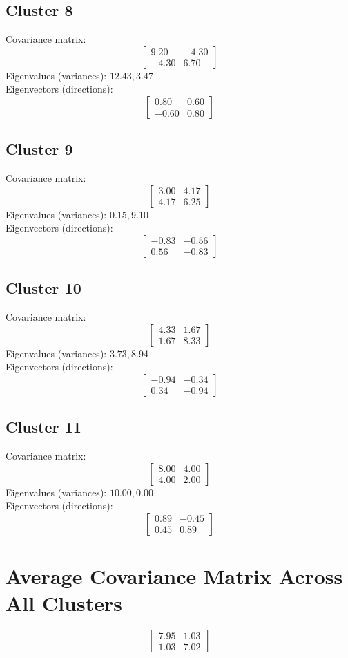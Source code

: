 \documentclass{article}
\begin{document}
\subsection*{Cluster 8}
Covariance matrix:
\[\begin{bmatrix}9.20 & -4.30 \\-4.30 & 6.70\end{bmatrix}\]
Eigenvalues (variances): $ 12.43, $3.47\\
Eigenvectors (directions):
\[\begin{bmatrix}0.80 & 0.60 \\-0.60 & 0.80\end{bmatrix}\]
\subsection*{Cluster 9}
Covariance matrix:
\[\begin{bmatrix}3.00 & 4.17 \\4.17 & 6.25\end{bmatrix}\]
Eigenvalues (variances): $ 0.15, $9.10\\
Eigenvectors (directions):
\[\begin{bmatrix}-0.83 & -0.56 \\0.56 & -0.83\end{bmatrix}\]
\subsection*{Cluster 10}
Covariance matrix:
\[\begin{bmatrix}4.33 & 1.67 \\1.67 & 8.33\end{bmatrix}\]
Eigenvalues (variances): $ 3.73, $8.94\\
Eigenvectors (directions):
\[\begin{bmatrix}-0.94 & -0.34 \\0.34 & -0.94\end{bmatrix}\]
\subsection*{Cluster 11}
Covariance matrix:
\[\begin{bmatrix}8.00 & 4.00 \\4.00 & 2.00\end{bmatrix}\]
Eigenvalues (variances): $ 10.00, $0.00\\
Eigenvectors (directions):
\[\begin{bmatrix}0.89 & -0.45 \\0.45 & 0.89\end{bmatrix}\]
\section*{Average Covariance Matrix Across All Clusters}
\[\begin{bmatrix}7.95 & 1.03 \\1.03 & 7.02\end{bmatrix}\]
\end{document}
